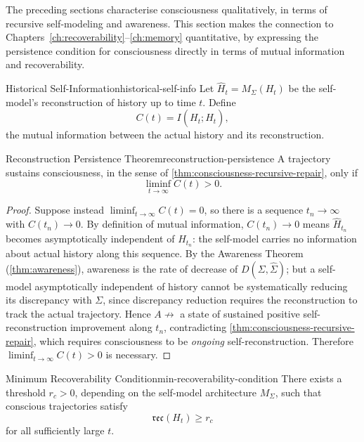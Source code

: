 \documentclass[12pt,twoside,openright]{book}
\begin{document}
The preceding sections characterise consciousness
qualitatively, in terms of recursive self-modeling and
awareness. This section makes the connection to
Chapters~\ref{ch:recoverability}--\ref{ch:memory}
quantitative, by expressing the persistence condition for
consciousness directly in terms of mutual information and
recoverability.

\begin{definition}{Historical Self-Information}{historical-self-info}
  Let $\hat{H}_t = M_\Sigma(H_t)$ be the self-model's
  reconstruction of history up to time $t$. Define
  \[
    C(t) = I(H_t; \hat{H}_t),
  \]
  the mutual information between the actual history and its
  reconstruction.
\end{definition}

\begin{theorem}{Reconstruction Persistence Theorem}{reconstruction-persistence}
  A trajectory sustains consciousness, in the sense of
  \cref{thm:consciousness-recursive-repair}, only if
  \[
    \liminf_{t\to\infty} C(t) > 0.
  \]
\end{theorem}

\begin{proof}
  Suppose instead $\liminf_{t\to\infty} C(t) = 0$, so there
  is a sequence $t_n\to\infty$ with $C(t_n)\to0$. By
  definition of mutual information, $C(t_n)\to0$ means
  $\hat{H}_{t_n}$ becomes asymptotically independent of
  $H_{t_n}$: the self-model carries no information about
  actual history along this sequence. By the Awareness
  Theorem (\cref{thm:awareness}), awareness is the rate of
  decrease of $D(\Sigma,\hat\Sigma)$; but a self-model
  asymptotically independent of history cannot be
  systematically reducing its discrepancy with $\Sigma$,
  since discrepancy reduction requires the reconstruction to
  track the actual trajectory. Hence
  $A \not\to$ a state of sustained positive
  self-reconstruction improvement along $t_n$, contradicting
  \cref{thm:consciousness-recursive-repair}, which requires
  consciousness to be \emph{ongoing} self-reconstruction.
  Therefore $\liminf_{t\to\infty} C(t) > 0$ is necessary.
\end{proof}

\begin{theorem}{Minimum Recoverability Condition}{min-recoverability-condition}
  There exists a threshold $r_c > 0$, depending on the
  self-model architecture $M_\Sigma$, such that conscious
  trajectories satisfy
  \[
    \mathfrak{rec}(H_t) \ge r_c
  \]
  for all sufficiently large
  $t$.
\end{theorem}
\end{document}
